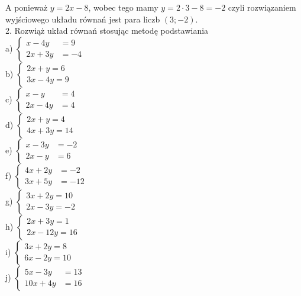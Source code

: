 \documentclass[10pt]{article}
\begin{document}
A ponieważ \(y=2 x-8\), wobec tego mamy \(y=2 \cdot 3-8=-2\) czyli rozwiązaniem wyjściowego układu równań jest para liczb \((3 ;-2)\).\\
2. Rozwiąż układ równań stosując metodę podstawiania\\
a) \(\left\{\begin{aligned} x-4 y & =9 \\ 2 x+3 y & =-4\end{aligned}\right.\)\\
b) \(\left\{\begin{array}{l}2 x+y=6 \\ 3 x-4 y=9\end{array}\right.\)\\
c) \(\left\{\begin{aligned} x-y & =4 \\ 2 x-4 y & =4\end{aligned}\right.\)\\
d) \(\left\{\begin{array}{l}2 x+y=4 \\ 4 x+3 y=14\end{array}\right.\)\\
e) \(\left\{\begin{aligned} x-3 y & =-2 \\ 2 x-y & =6\end{aligned}\right.\)\\
f) \(\left\{\begin{aligned} 4 x+2 y & =-2 \\ 3 x+5 y & =-12\end{aligned}\right.\)\\
g) \(\left\{\begin{array}{l}3 x+2 y=10 \\ 2 x-3 y=-2\end{array}\right.\)\\
h) \(\left\{\begin{array}{l}2 x+3 y=1 \\ 2 x-12 y=16\end{array}\right.\)\\
i) \(\left\{\begin{array}{l}3 x+2 y=8 \\ 6 x-2 y=10\end{array}\right.\)\\
j) \(\left\{\begin{aligned} 5 x-3 y & =13 \\ 10 x+4 y & =16\end{aligned}\right.\)\\
\end{document}

